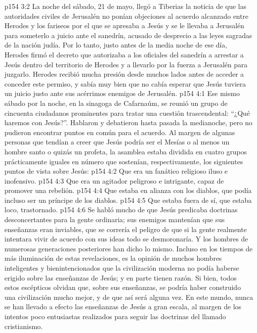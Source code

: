 \vs p154 3:2 La noche del sábado, 21 de mayo, llegó a Tiberias la noticia de que las autoridades civiles de Jerusalén no ponían objeciones al acuerdo alcanzado entre Herodes y los fariseos por el que se apresaba a Jesús y se le llevaba a Jerusalén para someterlo a juicio ante el sanedrín, acusado de desprecio a las leyes sagradas de la nación judía. Por lo tanto, justo antes de la media noche de ese día, Herodes firmó el decreto que autorizaba a los oficiales del sanedrín a arrestar a Jesús dentro del territorio de Herodes y a llevarlo por la fuerza a Jerusalén para juzgarlo. Herodes recibió mucha presión desde muchos lados antes de acceder a conceder este permiso, y sabía muy bien que no cabía esperar que Jesús tuviera un juicio justo ante sus acérrimos enemigos de Jerusalén.
\vs p154 4:1 Ese mismo sábado por la noche, en la sinagoga de Cafarnaúm, se reunió un grupo de cincuenta ciudadanos prominentes para tratar una cuestión trascendental: “¿Qué haremos con Jesús?”. Hablaron y debatieron hasta pasada la medianoche, pero no pudieron encontrar puntos en común para el acuerdo. Al margen de algunas personas que tendían a creer que Jesús podría ser el Mesías o al menos un hombre santo o quizás un profeta, la asamblea estaba dividida en cuatro grupos prácticamente iguales en número que sostenían, respectivamente, los siguientes puntos de vista sobre Jesús:
\vs p154 4:2 Que era un fanático religioso iluso e inofensivo.
\vs p154 4:3 Que era un agitador peligroso e intrigante, capaz de promover una rebelión.
\vs p154 4:4 Que estaba en alianza con los diablos, que podía incluso ser un príncipe de los diablos.
\vs p154 4:5 Que estaba fuera de sí, que estaba loco, trastornado.
\vs p154 4:6 \pc Se habló mucho de que Jesús predicaba doctrinas desconcertantes para la gente ordinaria; sus enemigos mantenían que sus enseñanzas eran inviables, que se correría el peligro de que si la gente realmente intentara vivir de acuerdo con sus ideas todo se desmoronaría. Y los hombres de numerosas generaciones posteriores han dicho lo mismo. Incluso en los tiempos de más iluminación de estas revelaciones, es la opinión de muchos hombres inteligentes y bienintencionados que la civilización moderna no podía haberse erigido sobre las enseñanzas de Jesús; y en parte tienen razón. Si bien, todos estos escépticos olvidan que, sobre sus enseñanzas, se podría haber construido una civilización mucho mejor, y de que así será alguna vez. En este mundo, nunca se han llevado a efecto las enseñanzas de Jesús a gran escala, al margen de los intentos poco entusiastas realizados para seguir las doctrinas del llamado cristianismo.
